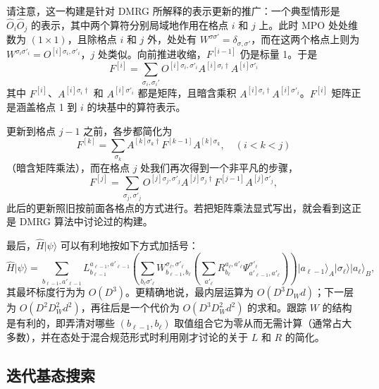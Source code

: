 \documentclass[a4paper,10pt,oneside,onecolumn,1p,times]{elsarticle}
\newcommand{\ket}[1]{\mbox{$| #1  \rangle$}}
\begin{document}
请注意，这一构建是针对 DMRG 所解释的表示更新的推广：一个典型情形是 $\hat{O}_i \hat{O}_j$ 的表示，其中两个算符分别局域地作用在格点 $i$ 和 $j$ 上。此时 MPO 处处维数为 $(1\times 1)$，且除格点 $i$ 和 $j$ 外，处处有 $W^{\sigma\sigma'} = \delta_{\sigma,\sigma'}$，而在这两个格点上则为 $W^{\sigma_i\sigma'_i} = O^{[i]\sigma_i,\sigma'_i}$，$j$ 处类似。向前推进收缩，$F^{[i-1]}$ 仍是标量 1。于是
\begin{equation}
F^{[i]} =  \sum_{\sigma_i,\sigma_i'} O^{[i]\sigma_i,\sigma'_i} A^{[i]\sigma_i\dagger} A^{[i]\sigma'_i}
\end{equation}
其中 $F^{[i]}$、$A^{[i]\sigma_i\dagger}$ 和 $A^{[i]\sigma'_i}$ 都是矩阵，且暗含乘积 $A^{[i]\sigma_i\dagger} A^{[i]\sigma'_i}$。$F^{[i]}$ 矩阵正是涵盖格点 1 到 $i$ 的块基中的算符表示。

更新到格点 $j-1$ 之前，各步都简化为
\begin{equation}
F^{[k]} =  \sum_{\sigma_k} A^{[k]\sigma_k\dagger} F^{[k-1]} A^{[k]\sigma_k} ,\quad (i<k<j)
\end{equation}
（暗含矩阵乘法），而在格点 $j$ 处我们再次得到一个非平凡的步骤，
\begin{equation}
F^{[j]} = \sum_{\sigma_j,\sigma'_j} O^{[j]\sigma_j,\sigma'_j} A^{[j]\sigma_j\dagger} F^{[j-1]} A^{[j]\sigma'_j},
\end{equation}
此后的更新照旧按前面各格点的方式进行。若把矩阵乘法显式写出，就会看到这正是 DMRG 算法中讨论过的构建。
  
最后，$\hat{H}\ket{\psi}$ 可以有利地按如下方式加括号：
\begin{equation}
\hat{H}\ket{\psi} = \sum_{b_{\ell-1}, a'_{\ell-1}} 
 L^{a_{\ell-1},a'_{\ell-1}}_{b_{\ell-1}} 
\left( \sum_{b_{\ell} \sigma'_{\ell}} 
W^{\sigma_{\ell},\sigma'_{\ell}}_{b_{\ell-1},b_{\ell}}
 \left( \sum_{a'_{\ell}} R^{a_{\ell},a'_{\ell}}_{b_{\ell}} \Psi^{\sigma'_{\ell}}_{a'_{\ell-1},a'_{\ell}} \right) \right) \ket{a_{\ell-1}}_A \ket{\sigma_{\ell}} \ket{a_{\ell}}_B ,
\end{equation}
其最坏标度行为为 $O(D^3)$。更精确地说，最内层运算为 $O(D^3 D_W d)$；下一层为 $O(D^2 D_W^2 d^2)$，再往后是一个代价为 $O(D^3 D_W^2 d^2)$ 的求和。跟踪 $W$ 的结构是有利的，即弄清对哪些 $(b_{\ell-1},b_{\ell})$ 取值组合它为零从而无需计算（通常占大多数），并在态处于混合规范形式时利用刚才讨论的关于 $L$ 和 $R$ 的简化。
 
\subsection{迭代基态搜索}
\end{document}
